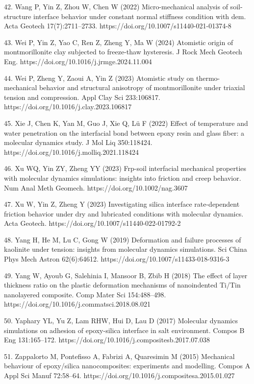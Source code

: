 \documentclass{article}
\begin{document}
\begin{hangpars}
42. Wang P, Yin Z, Zhou W, Chen W (2022) Micro-mechanical analysis of soil-structure interface behavior under constant normal stiffness condition with dem. Acta Geotech 17(7):2711–2733. https://doi.org/10.1007/s11440-021-01374-8

43. Wei P, Yin Z, Yao C, Ren Z, Zheng Y, Ma W (2024) Atomistic origin of montmorillonite clay subjected to freeze-thaw hysteresis. J Rock Mech Geotech Eng. https://doi.org/10.1016/j.jrmge.2024.11.004

44. Wei P, Zheng Y, Zaoui A, Yin Z (2023) Atomistic study on thermo-mechanical behavior and structural anisotropy of montmorillonite under triaxial tension and compression. Appl Clay Sci 233:106817. https://doi.org/10.1016/j.clay.2023.106817

45. Xie J, Chen K, Yan M, Guo J, Xie Q, Lü F (2022) Effect of temperature and water penetration on the interfacial bond between epoxy resin and glass fiber: a molecular dynamics study. J Mol Liq 350:118424. https://doi.org/10.1016/j.molliq.2021.118424

46. Xu WQ, Yin ZY, Zheng YY (2023) Frp-soil interfacial mechanical properties with molecular dynamics simulations: insights into friction and creep behavior. Num Anal Meth Geomech. https://doi.org/10.1002/nag.3607

47. Xu W, Yin Z, Zheng Y (2023) Investigating silica interface rate-dependent friction behavior under dry and lubricated conditions with molecular dynamics. Acta Geotech. https://doi.org/10.1007/s11440-022-01792-2

48. Yang H, He M, Lu C, Gong W (2019) Deformation and failure processes of kaolinite under tension: insights from molecular dynamics simulations. Sci China Phys Mech Astron 62(6):64612. https://doi.org/10.1007/s11433-018-9316-3

49. Yang W, Ayoub G, Salehinia I, Mansoor B, Zbib H (2018) The effect of layer thickness ratio on the plastic deformation mechanisms of nanoindented Ti/Tin nanolayered composite. Comp Mater Sci 154:488–498. https://doi.org/10.1016/j.commatsci.2018.08.021

50. Yaphary YL, Yu Z, Lam RHW, Hui D, Lau D (2017) Molecular dynamics simulations on adhesion of epoxy-silica interface in salt environment. Compos B Eng 131:165–172. https://doi.org/10.1016/j.compositesb.2017.07.038

51. Zappalorto M, Pontefisso A, Fabrizi A, Quaresimin M (2015) Mechanical behaviour of epoxy/silica nanocomposites: experiments and modelling. Compos A Appl Sci Manuf 72:58–64. https://doi.org/10.1016/j.compositesa.2015.01.027


\end{hangpars}
\end{document}
